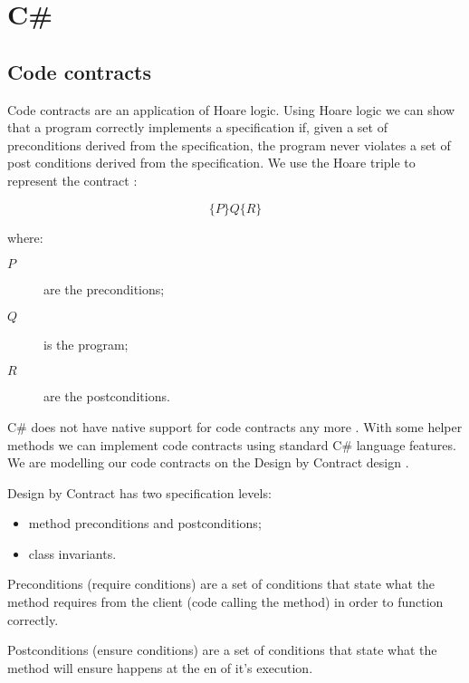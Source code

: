 
\chapter{C\#} %

\label{csharp} %

\section{Code contracts}

Code contracts are an application of Hoare logic. Using Hoare logic
we can show that a program correctly implements a specification if, given a set of 
preconditions derived from the specification, the program never violates a set of
post conditions derived from the specification. We use the Hoare triple to 
represent the contract \parencite{BasisForProgramming}:

\[
	\{P\}Q\{R\}
\]

where:
\begin{description}
	\item [$P$] are the preconditions;
	\item [$Q$] is the program;
	\item [$R$] are the postconditions.
\end{description}

C\# does not have native support for code contracts any more \parencite{NoCodeContracts}. 
With some helper methods we can implement code contracts using standard C\# language
features. We are modelling our code contracts on the Design by Contract design 
\parencite{ObjectOrientedSoftwareConstruction}.

Design by Contract has two specification levels:
\begin{itemize}
	\item method preconditions and postconditions;
	\item class invariants.
\end{itemize}

Preconditions (require conditions) are a set of conditions that state what the method requires from 
the client (code calling the method) in order to function correctly.

Postconditions (ensure conditions) are a set of conditions that state what the method will ensure 
happens at the en of it's execution.

